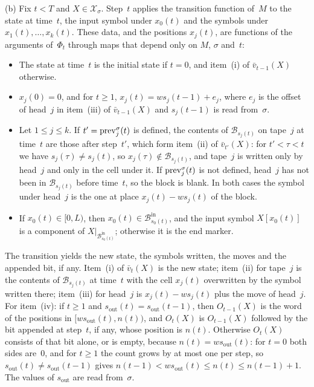 \begin{outline}
(b) Fix $t<T$ and $X\in\mathcal X_\sigma$. Step~$t$ applies the transition function of~$M$ to the state at time~$t$, the
input symbol under $x_0(t)$ and the symbols under $x_1(t),\dots,x_k(t)$. These data, and the positions $x_j(t)$, are
functions of the arguments of~$\Phi_t$ through maps that depend only on $M$, $\sigma$ and~$t$:
\begin{itemize}
\item The state at time~$t$ is the initial state if $t=0$, and item~(i) of $\bar v_{t-1}(X)$ otherwise.
\item $x_j(0)=0$, and for $t\ge1$, $x_j(t)=ws_j(t-1)+e_j$, where $e_j$ is the offset of head~$j$ in item~(iii) of
$\bar v_{t-1}(X)$ and $s_j(t-1)$ is read from~$\sigma$.
\item Let $1\le j\le k$. If $t'=\mathrm{prev}^\sigma_j(t)$ is defined, the contents of $\mathcal B_{s_j(t)}$ on tape~$j$ at
time~$t$ are those after step~$t'$, which form item~(ii) of $\bar v_{t'}(X)$: for $t'<\tau<t$ we have
$s_j(\tau)\ne s_j(t)$, so $x_j(\tau)\notin\mathcal B_{s_j(t)}$, and tape~$j$ is written only by head~$j$ and only in the
cell under it. If $\mathrm{prev}^\sigma_j(t)$ is not defined, head~$j$ has not been in $\mathcal B_{s_j(t)}$ before time~$t$, so
the block is blank. In both cases the symbol under head~$j$ is the one at place $x_j(t)-ws_j(t)$ of the block.
\item If $x_0(t)\in[0,L)$, then $x_0(t)\in\mathcal B^{\mathrm{in}}_{s_0(t)}$, and the input symbol $X[x_0(t)]$ is a
component of $X|_{\mathcal B^{\mathrm{in}}_{s_0(t)}}$; otherwise it is the end marker.
\end{itemize}
The transition yields the new state, the symbols written, the moves and the appended bit, if any. Item~(i) of
$\bar v_t(X)$ is the new state; item~(ii) for tape~$j$ is the contents of $\mathcal B_{s_j(t)}$ at time~$t$ with the
cell $x_j(t)$ overwritten by the symbol written there; item~(iii) for head~$j$ is $x_j(t)-ws_j(t)$ plus the move of
head~$j$. For item~(iv): if $t\ge1$ and $s_{\mathrm{out}}(t)=s_{\mathrm{out}}(t-1)$, then $O_{t-1}(X)$ is the word of
the positions in $[ws_{\mathrm{out}}(t),n(t))$, and $O_t(X)$ is $O_{t-1}(X)$ followed by the bit appended at step~$t$,
if any, whose position is $n(t)$. Otherwise $O_t(X)$ consists of that bit alone, or is empty, because
$n(t)=ws_{\mathrm{out}}(t)$: for $t=0$ both sides are~$0$, and for $t\ge1$ the count grows by at most one per step, so
$s_{\mathrm{out}}(t)\ne s_{\mathrm{out}}(t-1)$ gives $n(t-1)<ws_{\mathrm{out}}(t)\le n(t)\le n(t-1)+1$. The values of
$s_{\mathrm{out}}$ are read from~$\sigma$.


\end{outline}

